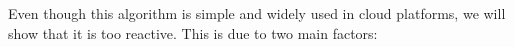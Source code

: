 


Even though this algorithm is simple and widely used in cloud
platforms, we will show that it is too reactive. This is due to two
main factors:



